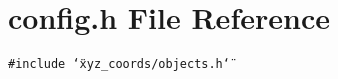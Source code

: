\section{config.h File Reference}
\label{config_8h}
{\tt \#include \char`\"{}xyz\_\-coords/objects.h\char`\"{}}\par

